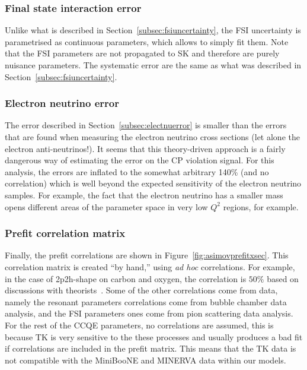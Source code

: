 \subsubsection{Final state interaction error}
Unlike what is described in Section~\ref{subsec:fsiuncertainty}, the
\Gls{FSI} uncertainty is parametrised as continuous parameters, which
allows to simply fit them. Note that the \Gls{FSI} parameters are not
propagated to \Gls{SK} and therefore are purely nuisance
parameters. The systematic error are the same as what was described in
Section~\ref{subsec:fsiuncertainty}.

\subsubsection{Electron neutrino error}
The error described in Section~\ref{subsec:electnuerror} is smaller
than the errors that are found when measuring the electron neutrino
cross sections (let alone the electron anti-neutrinos!). It seems that
this theory-driven approach is a fairly dangerous way of estimating
the error on the \Gls{CP} violation signal. For this analysis, the
errors are inflated to the somewhat arbitrary 140\% (and no
correlation) which is well beyond the expected sensitivity of the
electron neutrino samples. For example, the fact that the electron
neutrino has a smaller mass opens different areas of the parameter
space in very low $Q^2$ regions, for example.

\subsubsection{Prefit correlation matrix}
Finally, the prefit correlations are shown in
Figure~\ref{fig:asimovprefitxsec}. This correlation matrix is created
``by hand,'' using {\it ad hoc} correlations. For example, in the case
of \Gls{2p2h}-shape on carbon and oxygen, the correlation is $50\%$
based on discussions with theorists~\cite{NievesCorrelations}. Some of
the other correlations come from data, namely the resonant parameters
correlations come from bubble chamber data analysis, and the \Gls{FSI}
parameters ones come from pion scattering data analysis. For the rest
of the \Gls{CCQE} parameters, no correlations are assumed, this is
because \Gls{TK} is very sensitive to the these processes and usually
produces a bad fit if correlations are included in the prefit
matrix. This means that the \Gls{TK} data is not compatible with the
\Gls{MiniBooNE} and \Gls{MINERVA} data within our models.

